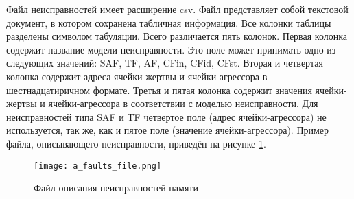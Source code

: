 Файл неисправностей имеет расширение csv. Файл представляет собой текстовой документ, в котором сохранена табличная информация. Все колонки таблицы разделены символом табуляции. Всего различается пять колонок. Первая колонка содержит название модели неисправности. Это поле может принимать одно из следующих значений: SAF, TF, AF, CFin, CFid, CFst. Вторая и четвертая колонка содержит адреса ячейки-жертвы и ячейки-агрессора в шестнадцатиричном формате. Третья и пятая колонка содержит значения ячейки-жертвы и ячейки-агрессора в соответствии с моделью неисправности. Для неисправностей типа SAF и TF четвертое поле (адрес ячейки-агрессора) не используется, так же, как и пятое поле (значение ячейки-агрессора). Пример файла, описывающего неисправности, приведён на рисунке \ref{fig:usage:faults_file}.

\begin{figure}[ht]
\centering
  \texttt{[image: a\_faults\_file.png]}  
  \caption{Файл описания неисправностей памяти}
  \label{fig:usage:faults_file}
\end{figure}

